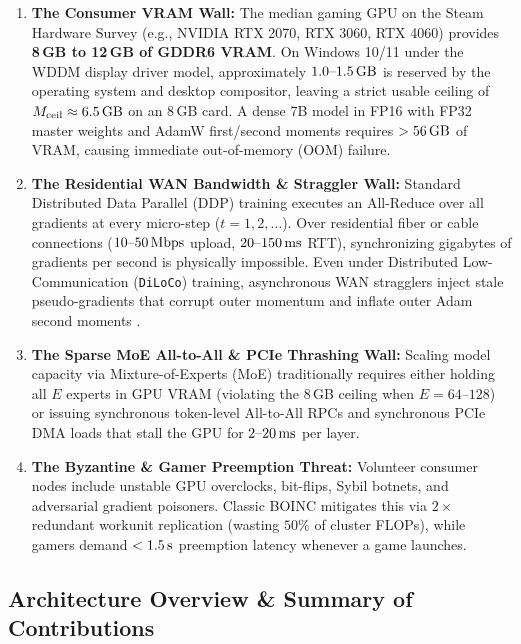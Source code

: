 \documentclass[11pt,a4paper]{article}
\begin{document}
\begin{enumerate}[leftmargin=1.8em]
    \item \textbf{The Consumer VRAM Wall:} The median gaming GPU on the Steam Hardware Survey (e.g., NVIDIA RTX 2070, RTX 3060, RTX 4060) provides \textbf{8\,GB to 12\,GB of GDDR6 VRAM}. On Windows 10/11 under the WDDM display driver model, approximately $1.0\text{--}1.5\text{\,GB}$ is reserved by the operating system and desktop compositor, leaving a strict usable ceiling of $M_{\text{ceil}} \approx 6.5\text{\,GB}$ on an 8\,GB card. A dense 7B model in FP16 with FP32 master weights and AdamW first/second moments requires $>56\text{\,GB}$ of VRAM, causing immediate out-of-memory (OOM) failure.
    \item \textbf{The Residential WAN Bandwidth \& Straggler Wall:} Standard Distributed Data Parallel (DDP) training executes an All-Reduce over all gradients at every micro-step ($t = 1, 2, \dots$). Over residential fiber or cable connections ($10\text{--}50\text{\,Mbps}$ upload, $20\text{--}150\text{\,ms}$ RTT), synchronizing gigabytes of gradients per second is physically impossible. Even under Distributed Low-Communication (\texttt{DiLoCo}) \cite{douillard2023diloco} training, asynchronous WAN stragglers inject stale pseudo-gradients that corrupt outer momentum and inflate outer Adam second moments \cite{shah2026cgad}.
    \item \textbf{The Sparse MoE All-to-All \& PCIe Thrashing Wall:} Scaling model capacity via Mixture-of-Experts (MoE) \cite{fedus2022switch,sukhbaatar2024btm,charles2025scalingdiloco} traditionally requires either holding all $E$ experts in GPU VRAM (violating the 8\,GB ceiling when $E = 64\text{--}128$) or issuing synchronous token-level All-to-All RPCs and synchronous PCIe DMA loads that stall the GPU for $2\text{--}20\text{\,ms}$ per layer.
    \item \textbf{The Byzantine \& Gamer Preemption Threat:} Volunteer consumer nodes include unstable GPU overclocks, bit-flips, Sybil botnets, and adversarial gradient poisoners. Classic BOINC mitigates this via $2\times$ redundant workunit replication (wasting $50\%$ of cluster FLOPs), while gamers demand $<1.5\text{\,s}$ preemption latency whenever a game launches.
\end{enumerate}

\subsection{Architecture Overview \& Summary of Contributions}
\end{document}
